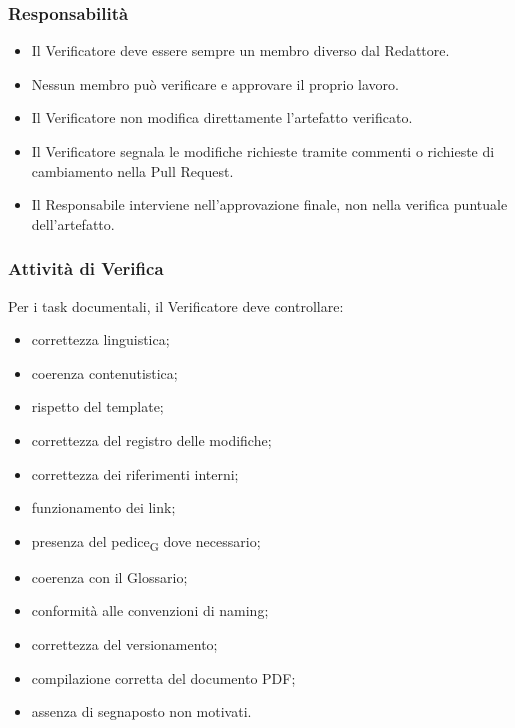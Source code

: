 
\subsubsection{Responsabilità}

\begin{itemize}
    \item Il Verificatore deve essere sempre un membro diverso dal Redattore.
    \item Nessun membro può verificare e approvare il proprio lavoro.
    \item Il Verificatore non modifica direttamente l'artefatto verificato.
    \item Il Verificatore segnala le modifiche richieste tramite commenti o richieste
    di cambiamento nella Pull Request.
    \item Il Responsabile interviene nell'approvazione finale, non nella verifica
    puntuale dell'artefatto.
\end{itemize}


\subsubsection{Attività di Verifica}

Per i task documentali, il Verificatore deve controllare:

\begin{itemize}
    \item correttezza linguistica;
    \item coerenza contenutistica;
    \item rispetto del template;
    \item correttezza del registro delle modifiche;
    \item correttezza dei riferimenti interni;
    \item funzionamento dei link;
    \item presenza del pedice\textsubscript{G} dove necessario;
    \item coerenza con il Glossario;
    \item conformità alle convenzioni di naming;
    \item correttezza del versionamento;
    \item compilazione corretta del documento PDF;
    \item assenza di segnaposto non motivati.
\end{itemize}


